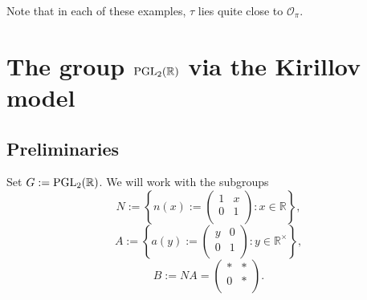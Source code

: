 \documentclass[reqno]{amsart} 
\numberwithin{equation}{section}
\numberwithin{theorem}{section}
\begin{document}
Note that in each of these examples, $\tau$ lies quite close to $\mathcal{O}_\pi$.

\section{The group $\operatorname{PGL}_2(\mathbb{R}\label{sec:d1a9162e9d89})$ via the Kirillov model}

\subsection{Preliminaries}\label{sec:d1a9162e9385}
Set $G := \operatorname{PGL}_2(\mathbb{R})$.  We will work with the subgroups
\begin{equation*}
N := \left\{ n(x) :=
  \begin{pmatrix}
1 & x \\
0 & 1 \\
\end{pmatrix} : x \in \mathbb{R}  \right\},
\end{equation*}
\begin{equation*}
  A :=
\left\{   a(y) := 
\begin{pmatrix}
y  & 0 \\
0 & 1 \\
\end{pmatrix} : y \in \mathbb{R}^\times  \right\},
\end{equation*}
\begin{equation*}
  B := N A
=
\begin{pmatrix}
\ast & \ast \\
0 & \ast \\
\end{pmatrix}.  
\end{equation*}
\end{document}
